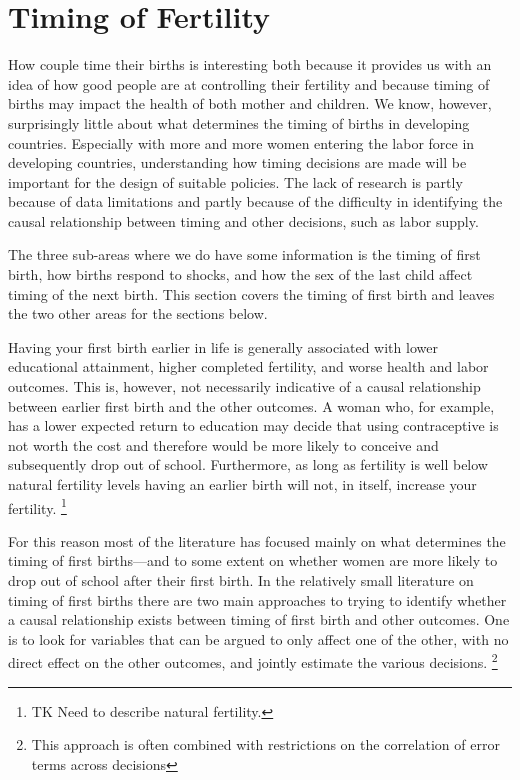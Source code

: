 \documentclass[letterpaper,12pt]{article}
\begin{document}
\section{Timing of Fertility}

\citet{Newman1984,Newman1988}

How couple time their births is interesting both because it provides
us with an idea of how good people are at controlling their
fertility and because timing of births may impact the health
of both mother and children.
We know, however, surprisingly little about what determines the
timing of births in developing countries.
Especially with more and more women entering the labor force
in developing countries, understanding how timing decisions are made will
be important for the design of suitable policies.
The lack of research is partly because of data limitations and 
partly because of the difficulty in identifying the causal relationship 
between timing and other decisions, such as labor supply.

The three sub-areas where we do have some information is the timing of 
first birth, how births respond to shocks, and how the sex of the 
last child affect timing of the next birth.
This section covers the timing of first birth and leaves the two
other areas for the sections below.

Having your first birth earlier in life is generally associated
with lower educational attainment, higher completed fertility,
and worse health and labor outcomes.
This is, however, not necessarily indicative of a causal
relationship between earlier first birth and the other outcomes.
A woman who, for example, has a lower expected return to education
may decide that using contraceptive is not worth the cost and 
therefore would be more likely to conceive and subsequently
drop out of school.
Furthermore, as long as fertility is well below natural
fertility levels having an earlier birth will not, in itself,
increase your fertility.%
\footnote{
TK Need to describe natural fertility.
}


For this reason most of the literature has focused mainly
on what determines the timing of first births---and to some
extent on whether women are more likely to drop out of
school after their first birth.
In the relatively small literature on timing of first
births there are two main approaches to trying to identify
whether a causal relationship exists between timing of
first birth and other outcomes.
One is to look for variables that can be argued to only
affect one of the other, with no direct effect on the 
other outcomes, and jointly estimate the various decisions.%
\footnote{
This approach is often combined with restrictions on the
correlation of error terms across decisions
}
\end{document}
